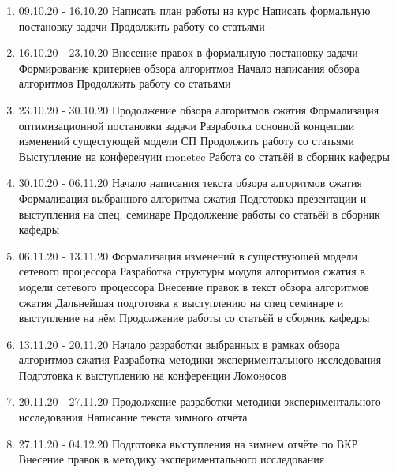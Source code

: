 \documentclass[a4peper, 12pt, titlepage, finall]{extreport}
\begin{document}
            \begin{enumerate}
                \item 09.10.20 - 16.10.20
                    \subitem Написать план работы на курс
                    \subitem Написать формальную постановку задачи
                    \subitem Продолжить работу со статьями
                \item 16.10.20 - 23.10.20
                    \subitem Внесение правок в формальную постановку задачи
                    \subitem Формирование критериев обзора алгоритмов
                    \subitem Начало написания обзора алгоритмов
                    \subitem Продолжить работу со статьями
                \item 23.10.20 - 30.10.20
                    \subitem Продолжение обзора алгоритмов сжатия
                    \subitem Формализация оптимизационной постановки задачи
                    \subitem Разработка основной концепции изменений сущестующей модели СП
                    \subitem Продолжить работу со статьями
                    \subitem Выступление на конференуии monetec
                    \subitem Работа со статьёй в сборник кафедры
                \item 30.10.20 - 06.11.20
                    \subitem Начало написания текста обзора алгоритмов сжатия
                    \subitem Формализация выбранного алгоритма сжатия
                    \subitem Подготовка презентации и выступления на спец. семинаре
                    \subitem Продолжение работы со статьёй в сборник кафедры
                \item 06.11.20 - 13.11.20
                    \subitem Формализация изменений в существующей модели сетевого процессора
                    \subitem Разработка структуры модуля алгоритмов сжатия в модели сетевого процессора
                    \subitem Внесение правок в текст обзора алгоритмов сжатия
                    \subitem Дальнейшая подготовка к выступлению на спец семинаре и выступление на нём
                    \subitem Продолжение работы со статьёй в сборник кафедры
                \item 13.11.20 - 20.11.20
                    \subitem Начало разработки выбранных в рамках обзора алгоритмов сжатия
                    \subitem Разработка методики экспериментального исследования
                    \subitem Подготовка к выступлению на конференции Ломоносов 
                \item 20.11.20 - 27.11.20
                    \subitem Продолжение разработки методики экспериментального исследования
                    \subitem Написание текста зимного отчёта
                \item 27.11.20 - 04.12.20
                    \subitem Подготовка выступления на зимнем отчёте по ВКР
                    \subitem Внесение правок в методику экспериментального исследования
            \end{enumerate}
\end{document}
